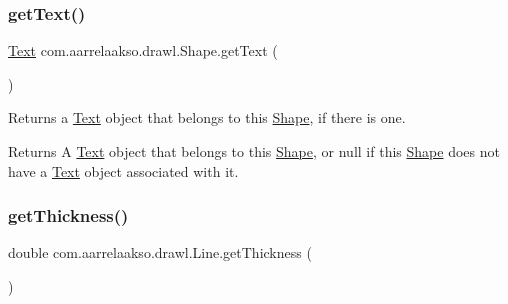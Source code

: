 \mbox{\label{classcom_1_1aarrelaakso_1_1drawl_1_1_shape_a6f876978d4102974fedc5b41c93c7b26}} 
\subsubsection{\texorpdfstring{get\+Text()}{getText()}}
{\footnotesize\ttfamily \hyperlink{classcom_1_1aarrelaakso_1_1drawl_1_1_text}{Text} com.\+aarrelaakso.\+drawl.\+Shape.\+get\+Text (\begin{DoxyParamCaption}{ }\end{DoxyParamCaption})\hspace{0.3cm}{\ttfamily [inherited]}}



Returns a \hyperlink{classcom_1_1aarrelaakso_1_1drawl_1_1_text}{Text} object that belongs to this \hyperlink{classcom_1_1aarrelaakso_1_1drawl_1_1_shape}{Shape}, if there is one. 

\begin{DoxyReturn}{Returns}
A \hyperlink{classcom_1_1aarrelaakso_1_1drawl_1_1_text}{Text} object that belongs to this \hyperlink{classcom_1_1aarrelaakso_1_1drawl_1_1_shape}{Shape}, or {\ttfamily null} if this \hyperlink{classcom_1_1aarrelaakso_1_1drawl_1_1_shape}{Shape} does not have a \hyperlink{classcom_1_1aarrelaakso_1_1drawl_1_1_text}{Text} object associated with it. 
\end{DoxyReturn}
\mbox{\label{classcom_1_1aarrelaakso_1_1drawl_1_1_line_aa25b4985b90dd7ebad4cbdc403f22a42}} 
\subsubsection{\texorpdfstring{get\+Thickness()}{getThickness()}}
{\footnotesize\ttfamily double com.\+aarrelaakso.\+drawl.\+Line.\+get\+Thickness (\begin{DoxyParamCaption}{ }\end{DoxyParamCaption})}

